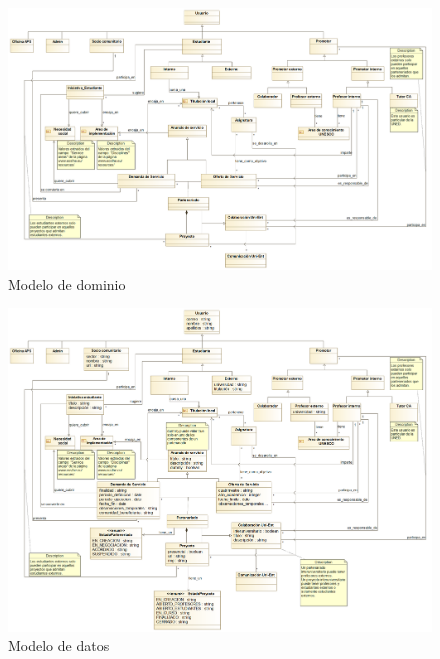 \documentclass[11pt]{book}
\begin{document}
\begin{landscape}
	\begin{figure}[p]
		\includegraphics[scale=0.4]{mdominio}
		\caption{Modelo de dominio}
		\label{fig:dominio}
	\end{figure}
\end{landscape}
\begin{landscape}
	\begin{figure}[p]
		\includegraphics[scale=0.35]{mdatos}
		\caption{Modelo de datos}
		\label{fig:datos}
	\end{figure}
\end{landscape}
\end{document}
